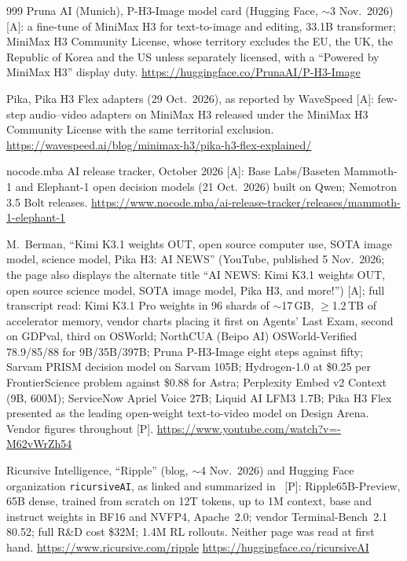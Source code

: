 \begin{thebibliography}{999}
 Pruna AI (Munich), P-H3-Image model card (Hugging Face, $\sim$3 Nov.\ 2026) [A]: a fine-tune of MiniMax H3 for text-to-image and editing, 33.1B transformer; MiniMax H3 Community License, whose territory excludes the EU, the UK, the Republic of Korea and the US unless separately licensed, with a ``Powered by MiniMax H3'' display duty. \url{https://huggingface.co/PrunaAI/P-H3-Image}

 Pika, Pika H3 Flex adapters (29 Oct.\ 2026), as reported by WaveSpeed [A]: few-step audio--video adapters on MiniMax H3 released under the MiniMax H3 Community License with the same territorial exclusion. \url{https://wavespeed.ai/blog/minimax-h3/pika-h3-flex-explained/}

 nocode.mba AI release tracker, October 2026 [A]: Base Labs/Baseten Mammoth-1 and Elephant-1 open decision models (21 Oct.\ 2026) built on Qwen; Nemotron 3.5 Bolt releases. \url{https://www.nocode.mba/ai-release-tracker/releases/mammoth-1-elephant-1}

 M.~Berman, ``Kimi K3.1 weights OUT, open source computer use, SOTA image model, science model, Pika H3: AI NEWS'' (YouTube, published 5 Nov.\ 2026; the page also displays the alternate title ``AI NEWS: Kimi K3.1 weights OUT, open source science model, SOTA image model, Pika H3, and more!'') [A]; full transcript read: Kimi K3.1 Pro weights in 96 shards of $\sim$17\,GB, $\geq$1.2\,TB of accelerator memory, vendor charts placing it first on Agents' Last Exam, second on GDPval, third on OSWorld; NorthCUA (Beipo AI) OSWorld-Verified 78.9/85/88 for 9B/35B/397B; Pruna P-H3-Image eight steps against fifty; Sarvam PRISM decision model on Sarvam 105B; Hydrogen-1.0 at \$0.25 per FrontierScience problem against \$0.88 for Astra; Perplexity Embed v2 Context (9B, 600M); ServiceNow Apriel Voice 27B; Liquid AI LFM3 1.7B; Pika H3 Flex presented as the leading open-weight text-to-video model on Design Arena. Vendor figures throughout [P]. \url{https://www.youtube.com/watch?v=-M62vWrZh54}

 Ricursive Intelligence, ``Ripple'' (blog, $\sim$4 Nov.\ 2026) and Hugging Face organization \texttt{ricursiveAI}, as linked and summarized in~\cite{lit-witteveen-ripple} [P]: Ripple65B-Preview, 65B dense, trained from scratch on 12T tokens, up to 1M context, base and instruct weights in BF16 and NVFP4, Apache~2.0; vendor Terminal-Bench~2.1 80.52; full R\&D cost \$32M; 1.4M RL rollouts. Neither page was read at first hand. \url{https://www.ricursive.com/ripple} \url{https://huggingface.co/ricursiveAI}


\end{thebibliography}
